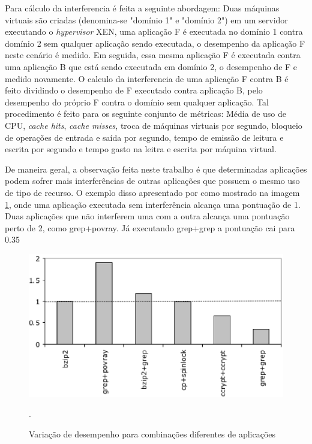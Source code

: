 Para cálculo da interferencia é feita a seguinte abordagem: Duas máquinas virtuais são criadas (denomina-se "domínio 1" e "domínio 2") em um servidor executando o \textit{hypervisor} XEN,  uma aplicação F é executada no domínio 1 contra domínio 2 sem qualquer aplicação sendo executada, o desempenho da aplicação F neste cenário é medido. Em seguida, essa mesma aplicação F é executada contra uma aplicação B que está sendo executada em domínio 2, o desempenho de F e medido novamente. O calculo da interferencia de uma aplicação F contra B é feito dividindo o desempenho de F executado contra aplicação B, pelo desempenho do próprio F contra o domínio sem qualquer aplicação. Tal procedimento é feito para os seguinte conjunto de métricas: Média de uso de CPU, \textit{cache hits}, \textit{cache misses}, troca de máquinas virtuais por segundo, bloqueio de operações de entrada e saída por segundo, tempo de emissão de leitura e escrita por segundo e tempo gasto na leitra e escrita por máquina virtual. 

De maneira geral, a observação feita neste trabalho é que determinadas aplicações podem sofrer mais interferências de outras aplicações que possuem o mesmo uso de tipo de recurso. O exemplo disso apresentado por  como mostrado na imagem \ref{interference_app}, onde uma aplicação executada sem interferência alcança uma pontuação de 1. Duas aplicações que não interferem uma com a outra alcança uma pontuação perto de 2, como grep+povray. Já executando grep+grep a pontuação cai para 0.35 %

\begin{figure}[!htb]
\centering
\includegraphics [keepaspectratio=true,scale=0.65]{figuras/interference_aplications.eps}
\caption{Variação de desempenho para combinações diferentes de aplicações}
\cite{koh2007}.
\label{interference_app}
\end{figure}

